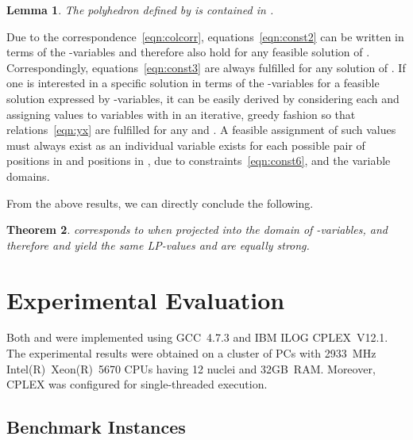 \documentclass[11pt,a4paper]{article}
\newtheorem{theorem}{Theorem}[section]
\newtheorem{lemma}[theorem]{Lemma}
\newenvironment{proof}[1][Proof]{\begin{trivlist}
\item[\hskip \labelsep {\bfseries #1}]}{\end{trivlist}}
\begin{document}
\begin{lemma}
The polyhedron defined by  is contained in .
\end{lemma}
\begin{proof}
Due to the correspondence~\eqref{eqn:colcorr},
equations~\eqref{eqn:const2} can be written in terms of the
-variables and therefore also hold for any feasible solution of .
Correspondingly, equations~\eqref{eqn:const3} are always fulfilled for
any solution of .
If one is interested in a specific solution in terms of the
-variables for a feasible solution expressed by -variables, 
it can be easily derived by considering
each  and assigning values to variables  with
 in an iterative, greedy fashion 
so that relations~\eqref{eqn:yx} are fulfilled for any  and . 
A feasible assignment of such values must always exist
as an individual  variable exists for each possible pair 
of positions  in  and positions  in ,
due to constraints~\eqref{eqn:const6}, and the variable domains.
\end{proof}

From the above results, we can directly conclude the following.
\begin{theorem}
 corresponds to  when projected into the domain of
-variables, and therefore  and  yield the same
LP-values and are equally strong.
\end{theorem}


\section{Experimental Evaluation}
\label{sec:experiments}

Both  and  were implemented using GCC~4.7.3
and IBM ILOG CPLEX~V12.1. The experimental results were obtained on a
cluster of PCs with 2933~MHz Intel(R)~Xeon(R)~5670 CPUs having 12 nuclei 
and 32GB~RAM. Moreover, CPLEX was configured for single-threaded execution.

\subsection{Benchmark Instances}
\end{document}
